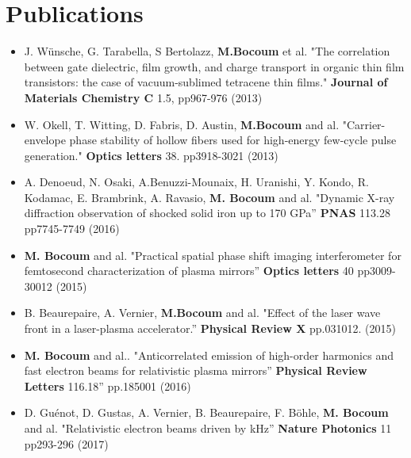 \documentclass[11pt,a4paper,sans]{moderncv} %
\begin{document}

\section{Publications}

\renewcommand{\listitemsymbol}{-~} %

\begin{itemize}
\item J. Wünsche, G. Tarabella, S Bertolazz, \textbf{M.Bocoum} et al. "The correlation between gate dielectric, film growth, and charge transport in organic thin film transistors: the case of vacuum-sublimed tetracene thin films."  \textbf{Journal of Materials Chemistry C}  1.5, pp967-976  (2013) 

\item W. Okell, T. Witting, D. Fabris, D. Austin, \textbf{M.Bocoum} and al. "Carrier-envelope phase stability of hollow fibers used for high-energy few-cycle pulse generation." \textbf{Optics letters} 38. pp3918-3021 (2013)

\item A. Denoeud, N. Osaki, A.Benuzzi-Mounaix, H. Uranishi, Y. Kondo, R. Kodamac, E. Brambrink, A. Ravasio, \textbf{M. Bocoum} and al. "Dynamic X-ray diffraction observation of shocked solid iron up to 170 GPa” \textbf{PNAS} 113.28 pp7745-7749 (2016)

\item \textbf{M. Bocoum} and al. "Practical spatial phase shift imaging interferometer for femtosecond characterization of plasma mirrors” \textbf{Optics letters} 40 pp3009-30012 (2015)

\item B. Beaurepaire, A. Vernier, \textbf{M.Bocoum} and al. "Effect of the laser wave front in a laser-plasma accelerator.” \textbf{Physical Review X} pp.031012. (2015)

\item \textbf{M. Bocoum}  and al.. "Anticorrelated emission of high-order harmonics and fast electron beams for relativistic plasma mirrors”  \textbf{Physical Review Letters} 116.18” pp.185001  (2016)

\item  D. Guénot, D. Gustas, A. Vernier, B. Beaurepaire, F. Böhle, \textbf{M. Bocoum} and al. "Relativistic electron beams driven by kHz” \textbf{Nature Photonics} 11 pp293-296 (2017)

\end{itemize}

\end{document}
